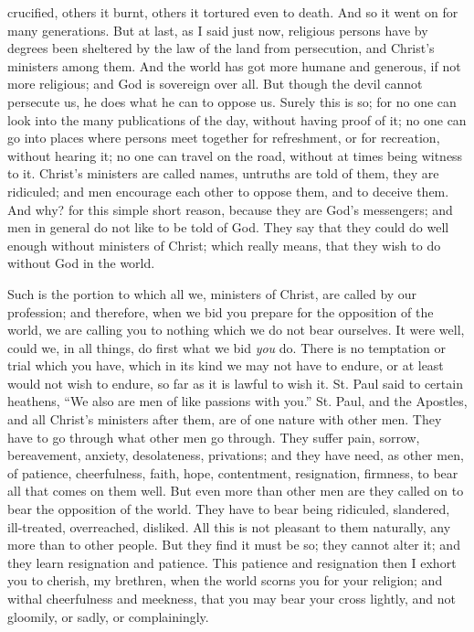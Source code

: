 crucified, others it burnt, others it tortured even to death. And so
it went on for many generations. But at last, as I said just now,
religious persons have by degrees been sheltered by the law of the
land from persecution, and Christ's ministers among them. And the
world has got more humane and generous, if not more religious; and
God
is sovereign over all. But though the devil cannot persecute us, he
does what he can to oppose us. Surely this is so; for no one can look
into the many publications of the day, without having proof of it; no
one can go into places where persons meet together for refreshment, or
for recreation, without hearing it; no one can travel on the road,
without at times being witness to it. Christ's ministers are called
names, untruths are told of them, they are ridiculed; and men
encourage each other to oppose them, and to deceive them. And why? for
this simple short reason, because they are God's messengers; and men
in general do not like to be told of God. They say that they could do
well enough without ministers of Christ; which really means, that they
wish to do without God in the world.

Such is the portion to which all we, ministers of Christ, are
called by our profession; and therefore, when we bid you prepare for
the opposition of the world, we are calling you to nothing which we do
not bear ourselves. It were well, could we, in all things, do first
what we bid \emph{you} do. There is no temptation or trial which you
have, which in its kind we may not have to endure, or at least would
not wish to endure, so far as it is lawful to wish it. St. Paul said
to certain heathens, ``We also are men of like passions with
you.'' St. Paul, and the Apostles, and all Christ's ministers
after them, are of one nature with other men. They have to go through
what other men go through. They suffer pain, sorrow, bereavement,
anxiety, desolateness, privations; and they have need, as other men,
of patience, cheerfulness, faith, hope, contentment, resignation,
firmness, to bear all that comes on them well. But even more than
other men are they called on to bear the opposition of the world. They
have to bear being ridiculed, slandered, ill-treated, overreached,
disliked. All this is not pleasant to them naturally, any more than to
other people. But they find it must be so; they cannot alter it; and
they learn resignation and patience. This patience and resignation
then I exhort you to cherish, my brethren, when the world scorns you
for your religion; and withal cheerfulness and meekness, that you may
bear your cross lightly, and not gloomily, or sadly, or complainingly.


